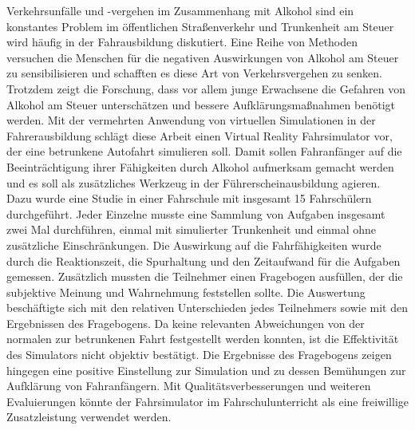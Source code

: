Verkehrsunfälle und -vergehen im Zusammenhang mit Alkohol sind ein konstantes Problem im öffentlichen Straßenverkehr und Trunkenheit am Steuer wird häufig in der Fahrausbildung diskutiert.
Eine Reihe von Methoden versuchen die Menschen für die negativen Auswirkungen von Alkohol am Steuer zu sensibilisieren und schafften es diese Art von Verkehrsvergehen zu senken.
Trotzdem zeigt die Forschung, dass vor allem junge Erwachsene die Gefahren von Alkohol am Steuer unterschätzen und bessere Aufklärungsmaßnahmen benötigt werden. 
Mit der vermehrten Anwendung von virtuellen Simulationen in der Fahrerausbildung schlägt diese Arbeit einen Virtual Reality Fahrsimulator vor, der eine betrunkene Autofahrt simulieren soll.
Damit sollen Fahranfänger auf die Beeinträchtigung ihrer Fähigkeiten durch Alkohol aufmerksam gemacht werden und es soll als zusätzliches Werkzeug in der Führerscheinausbildung agieren.
Dazu wurde eine Studie in einer Fahrschule mit insgesamt 15 Fahrschülern durchgeführt.
Jeder Einzelne musste eine Sammlung von Aufgaben insgesamt zwei Mal durchführen, einmal mit simulierter Trunkenheit und einmal ohne zusätzliche Einschränkungen.
Die Auswirkung auf die Fahrfähigkeiten wurde durch die Reaktionszeit, die Spurhaltung und den Zeitaufwand für die Aufgaben gemessen.
Zusätzlich mussten die Teilnehmer einen Fragebogen ausfüllen, der die subjektive Meinung und Wahrnehmung feststellen sollte.
Die Auswertung beschäftigte sich mit den relativen Unterschieden jedes Teilnehmers sowie mit den Ergebnissen des Fragebogens.
Da keine relevanten Abweichungen von der normalen zur betrunkenen Fahrt festgestellt werden konnten, ist die Effektivität des Simulators nicht objektiv bestätigt.
Die Ergebnisse des Fragebogens zeigen hingegen eine positive Einstellung zur Simulation und zu dessen Bemühungen zur Aufklärung von Fahranfängern.  
Mit Qualitätsverbesserungen und weiteren Evaluierungen könnte der Fahrsimulator im Fahrschulunterricht als eine freiwillige Zusatzleistung verwendet werden.
